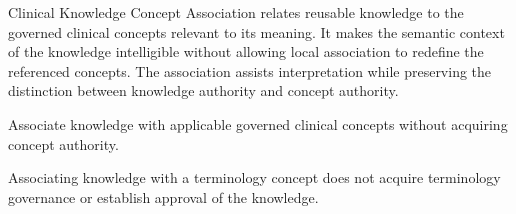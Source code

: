 Clinical Knowledge Concept Association relates reusable knowledge to the governed clinical concepts relevant to its meaning. It makes the semantic context of the knowledge intelligible without allowing local association to redefine the referenced concepts. The association assists interpretation while preserving the distinction between knowledge authority and concept authority.



Associate knowledge with applicable governed clinical concepts without acquiring concept authority.



Associating knowledge with a terminology concept does not acquire terminology governance or establish approval of the knowledge.


